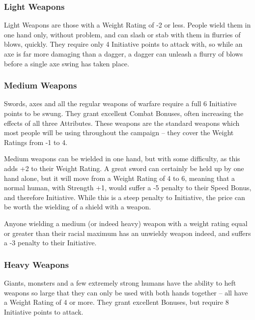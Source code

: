\documentclass[titlepage,a4paper,openany]{book}
\begin{document}
\weaponschart

\begin{multicols}{2}

\subsubsection{Light Weapons}

Light Weapons are those with a Weight Rating of -2 or less. People wield them in one hand only, without problem, and can slash or stab with them in flurries of blows, quickly. They require only 4 Initiative points to attack with, so while an axe is far more damaging than a dagger, a dagger can unleash a flurry of blows before a single axe swing has taken place.

\subsubsection{Medium Weapons}

Swords, axes and all the regular weapons of warfare require a full 6 Initiative points to be swung. They grant excellent Combat Bonuses, often increasing the effects of all three Attributes. These weapons are the standard weapons which most people will be using throughout the campaign -- they cover the Weight Ratings from -1 to 4.

Medium weapons can be wielded in one hand, but with some difficulty, as this adds +2 to their Weight Rating. A great sword can certainly be held up by one hand alone, but it will move from a Weight Rating of 4 to 6, meaning that a normal human, with Strength +1, would suffer a -5 penalty to their Speed Bonus, and therefore Initiative. While this is a steep penalty to Initiative, the price can be worth the wielding of a shield with a weapon.

Anyone wielding a medium (or indeed heavy) weapon with a weight rating equal or greater than their racial maximum has an unwieldy weapon indeed, and suffers a -3 penalty to their Initiative.

\subsubsection{Heavy Weapons}

Giants, monsters and a few extremely strong humans have the ability to heft weapons so large that they can only be used with both hands together -- all have a Weight Rating of 4 or more.
They grant excellent Bonuses, but require 8 Initiative points to attack.


\end{multicols}
\end{document}

